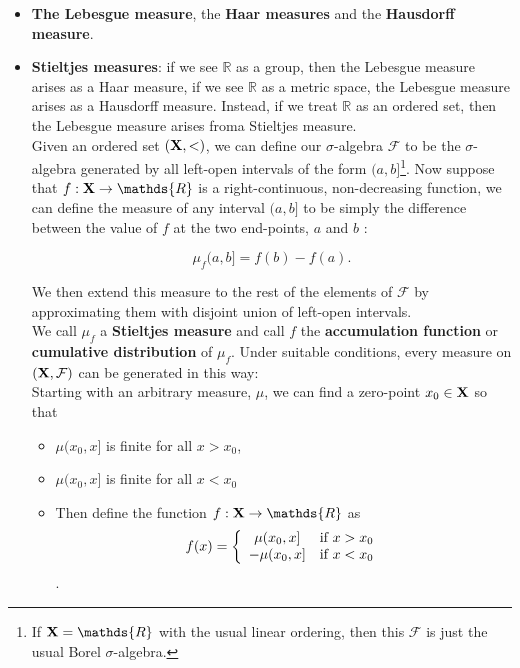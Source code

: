 \documentclass{homework}
\begin{document}
\begin{itemize}
    \clearpage
    
    \item \textbf{The Lebesgue measure}, the \textbf{Haar measures} and the \textbf{Hausdorff measure}. \\ 
    
    \item \textbf{Stieltjes measures}: if we see $\mathds{R}$ as a group, then the Lebesgue measure arises as a Haar measure, if we see $\mathds{R}$ as a metric space, the Lebesgue measure arises as a Hausdorff measure. Instead, if we treat $\mathds{R}$ as an ordered set, then the Lebesgue measure arises froma Stieltjes measure.\\
    
    Given an ordered set $({\bf X}, <)$, we can define our $\sigma$-algebra $\mathcal{F}$ to be the $\sigma$-algebra generated by all left-open intervals of the form $(a,b ]$\footnote{If ${\bf X}=\mathds{R}$ with the usual linear ordering, then this $\mathcal{F}$ is just the usual Borel $\sigma$-algebra.}. Now suppose that $f: {\bf X}\rightarrow \mathds{R}    $ is a  right-continuous, non-decreasing function, we can define the measure of any interval $(a,b]$ to be simply the difference between the value of $f$ at the two end-points, $a$ and $b$ :
    
    $$
    \mu_f (a,b] = f(b) - f(a).
    $$
    
    We then extend this measure to the rest of the elements of $\mathcal{F}$ by approximating them with disjoint union of left-open intervals. \\
    
    We call $\mu_f$ a \textbf{Stieltjes measure} and call $f$ the \textbf{accumulation function} or \textbf{cumulative distribution} of $\mu_f$. Under suitable conditions, every measure on $({\bf X}, \mathcal{F})$ can be generated in this way: \\
    Starting with an arbitrary measure, $\mu$, we can find a zero-point $x_0 \in {\bf X}$ so that 
    
    \begin{itemize}
        \item $\mu(x_0, x]$ is finite for all $x > x_0$, \\
        \item $\mu(x_0, x]$ is finite for all $x < x_0$ \\
        \item Then define the function $f: {\bf X} \rightarrow \mathds{R}$ as 
    $$
    f(x) = \bigg\{ \begin{array}{ccc}
       \mu(x_0, x]  & \textnormal{if } x > x_0  \\
       -\mu(x_0, x]  & \textnormal{if } x < x_0 
    \end{array}
    $$.
    \end{itemize}
    

\end{itemize}
\end{document}

